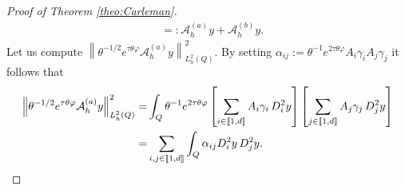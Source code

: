 \documentclass{amsart}
\numberwithin{equation}{section}
\begin{document}
\begin{proof}[Proof of Theorem \ref{theo:Carleman}]
\begin{align*}
&=:\mathcal{A}^{(a)}_{h}y+\mathcal{A}^{(b)}_{h}y.
\end{align*}
Let us compute $\left\| \theta^{-1/2}e^{\tau\theta\varphi}\mathcal{A}_{h}^{(a)}y\right\|^{2}_{L_{h}^{2}(Q)}$. By setting $\alpha_{ij}:= \theta^{-1} e^{2\tau\theta\varphi}A_{i}\gamma_{i}A_{j} \gamma_{j}$ it follows that
    \begin{align}\label{eq:A(a)}
\left\|\theta^{-1/2}e^{\tau\theta\varphi}\mathcal{A}^{(a)}_{h}y\right\|^{2}_{L_{h}^{2}(Q)}=&\int_{Q}\theta^{-1}e^{2\tau\theta\varphi}\left[\sum_{i\in\llbracket 1,d\rrbracket}A_{i}\gamma_{i}\,D_{i}^{2}y \right]\left[\sum_{j\in\llbracket 1,d\rrbracket}A_{j}\gamma_{j}\,D_{j}^{2}y \right] \notag\\
        =&\sum_{i,j\in\llbracket 1,d\rrbracket}\int_{Q}\alpha_{ij} D_{i}^{2}y\,D_{j}^{2}y. 
    \end{align}


\end{proof}
\end{document}
